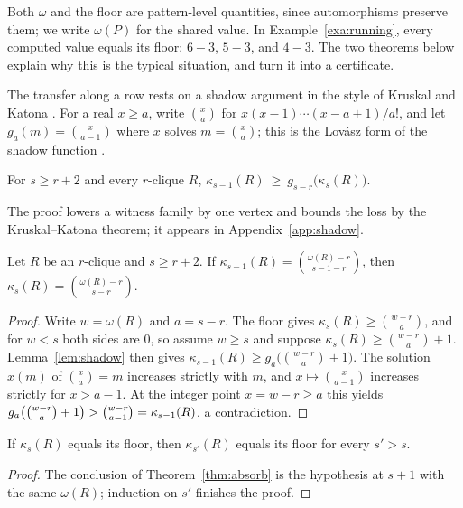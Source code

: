 Both $\omega$ and the floor are pattern-level quantities, since automorphisms preserve them; we write $\omega(P)$ for the shared value.
%
In Example~\ref{exa:running}, every computed value equals its floor: $6-3$, $5-3$, and $4-3$.
%
The two theorems below explain why this is the typical situation, and turn it into a certificate.

The transfer along a row rests on a shadow argument in the style of Kruskal and Katona \cite{kruskal1963,katona1968}.
%
For a real $x\ge a$, write $\binom{x}{a}$ for $x(x-1)\cdots(x-a+1)/a!$, and let $g_a(m)=\binom{x}{a-1}$ where $x$ solves $m=\binom{x}{a}$; this is the Lov\'asz form of the shadow function \cite{lovasz1979}.

\begin{lemma}\label{lem:shadow}
For $s\ge r+2$ and every $r$-clique $R$,
$\kappa_{s-1}(R)\ \ge\ g_{s-r}\bigl(\kappa_{s}(R)\bigr)$.
\end{lemma}

The proof lowers a witness family by one vertex and bounds the loss by the Kruskal--Katona theorem; it appears in Appendix~\ref{app:shadow}.

\begin{theorem}[Absorption]\label{thm:absorb}
Let $R$ be an $r$-clique and $s\ge r+2$.
%
If $\kappa_{s-1}(R)=\binom{\omega(R)-r}{\,s-1-r\,}$, then $\kappa_{s}(R)=\binom{\omega(R)-r}{\,s-r\,}$.
\end{theorem}

\begin{proof}
Write $w=\omega(R)$ and $a=s-r$.
%
The floor gives $\kappa_s(R)\ge\binom{w-r}{a}$, and for $w<s$ both sides are $0$, so assume $w\ge s$ and suppose $\kappa_s(R)\ge\binom{w-r}{a}+1$.
%
Lemma~\ref{lem:shadow} then gives $\kappa_{s-1}(R)\ge g_a\bigl(\binom{w-r}{a}+1\bigr)$.
%
The solution $x(m)$ of $\binom{x}{a}=m$ increases strictly with $m$, and $x\mapsto\binom{x}{a-1}$ increases strictly for $x>a-1$.
%
At the integer point $x=w-r\ge a$ this yields $g_a\bigl(\tbinom{w-r}{a}+1\bigr)>\binom{w-r}{a-1}=\kappa_{s-1}(R)$, a contradiction.
\end{proof}

\begin{corollary}\label{cor:absorb}
If $\kappa_{s}(R)$ equals its floor, then $\kappa_{s'}(R)$ equals its floor for every $s'>s$.
\end{corollary}

\begin{proof}
The conclusion of Theorem~\ref{thm:absorb} is the hypothesis at $s+1$ with the same $\omega(R)$; induction on $s'$ finishes the proof.
\end{proof}

